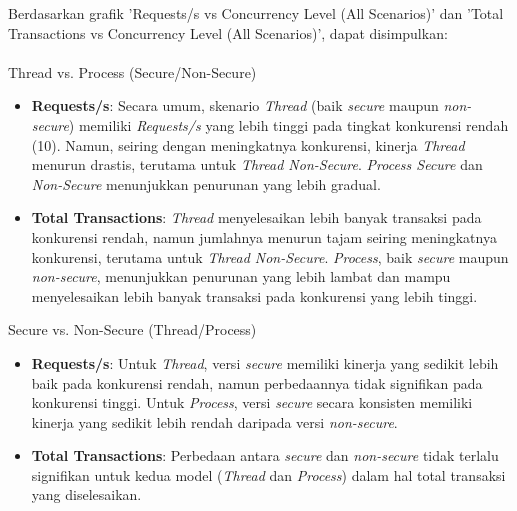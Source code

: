 \documentclass[12pt]{article}
\begin{document}
Berdasarkan grafik 'Requests/s vs Concurrency Level (All Scenarios)' dan 'Total Transactions vs Concurrency Level (All Scenarios)', dapat disimpulkan:
\\\\
Thread vs. Process (Secure/Non-Secure)
\begin{itemize}
    \item \textbf{Requests/s}: Secara umum, skenario \textit{Thread} (baik \textit{secure} maupun \textit{non-secure}) memiliki \textit{Requests/s} yang lebih tinggi pada tingkat konkurensi rendah (10). Namun, seiring dengan meningkatnya konkurensi, kinerja \textit{Thread} menurun drastis, terutama untuk \textit{Thread Non-Secure}. \textit{Process Secure} dan \textit{Non-Secure} menunjukkan penurunan yang lebih gradual.
    \item \textbf{Total Transactions}: \textit{Thread} menyelesaikan lebih banyak transaksi pada konkurensi rendah, namun jumlahnya menurun tajam seiring meningkatnya konkurensi, terutama untuk \textit{Thread Non-Secure}. \textit{Process}, baik \textit{secure} maupun \textit{non-secure}, menunjukkan penurunan yang lebih lambat dan mampu menyelesaikan lebih banyak transaksi pada konkurensi yang lebih tinggi.
\end{itemize}

Secure vs. Non-Secure (Thread/Process)
\begin{itemize}
    \item \textbf{Requests/s}: Untuk \textit{Thread}, versi \textit{secure} memiliki kinerja yang sedikit lebih baik pada konkurensi rendah, namun perbedaannya tidak signifikan pada konkurensi tinggi. Untuk \textit{Process}, versi \textit{secure} secara konsisten memiliki kinerja yang sedikit lebih rendah daripada versi \textit{non-secure}.
    \item \textbf{Total Transactions}: Perbedaan antara \textit{secure} dan \textit{non-secure} tidak terlalu signifikan untuk kedua model (\textit{Thread} dan \textit{Process}) dalam hal total transaksi yang diselesaikan.
\end{itemize}
\end{document}
